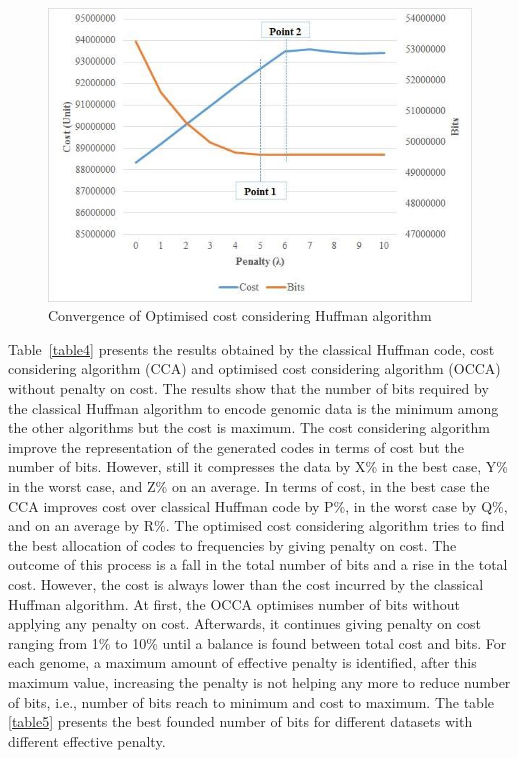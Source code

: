 \documentclass[preprint,12pt]{elsarticle}
\begin{document}
\begin{figure}[h]
\begin{center}
\includegraphics[scale=0.7]{Images/Drawing4_1.jpg}
\caption{Convergence of Optimised cost considering Huffman algorithm}
\end{center}
\label{Fig5}
\end{figure}
Table~\ref{table4} presents the results obtained by the classical Huffman code, cost considering algorithm (CCA) and optimised cost considering algorithm (OCCA) without penalty on cost. The results show that the number of bits required by the classical Huffman algorithm to encode genomic data is the minimum among the other algorithms but the cost is  maximum. The cost considering algorithm improve the representation of the generated codes in terms of cost but the number of bits. However, still it compresses the data by X\% in the best case, Y\% in the worst case, and Z\% on an average. In terms of cost, in the best case the CCA improves cost over classical Huffman code by P\%, in the worst case by Q\%, and on an average by R\%.  The optimised cost considering algorithm tries to find the best allocation of codes to frequencies by giving penalty on cost. The outcome of this process is a fall in the total number of bits and a rise in the total cost. However, the cost is always lower than the cost incurred by the classical Huffman algorithm.  At first, the OCCA optimises number of bits without applying any penalty on cost. Afterwards, it continues giving penalty on cost ranging from 1\% to 10\% until a balance is found between total cost and bits. For each genome, a maximum amount of effective penalty is identified, after this maximum value, increasing the penalty is not helping any more to reduce number of bits, i.e., number of bits reach to minimum and cost to maximum.  The table \ref{table5} presents the best founded number of bits for different datasets with different effective penalty.  %
\end{document}
